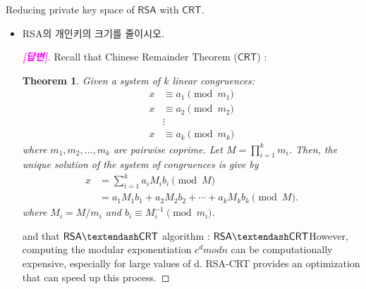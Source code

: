 \documentclass{article}
\newtheorem*{theorem*}{Theorem}
\newcommand{\rsa}{\mathsf{RSA}}
\newcommand{\rsacrt}{\mathsf{RSA}\textendash\mathsf{CRT}}
\newcommand{\inv}[1]{#1^{-1}}
\begin{document}
	
	
	\begin{center}
		\huge Reducing private key space of $\rsa$ with $\mathsf{CRT}$.
	\end{center}
	
	\begin{itemize}
		\item RSA의 개인키의 크기를 줄이시오. \begin{proof}[\normalfont\bf\textcolor{magenta}{[답변]}]
			Recall that Chinese Remainder Theorem ($\mathsf{CRT}$) : 
			\begin{tcolorbox}[title=Chinese Remainder Theorem (CRT)]
				\begin{theorem*}
					Given a system of $k$ linear congruences:
					\begin{align*}
					x&\equiv a_1 \pmod{m_1}\\
					x&\equiv a_2 \pmod{m_2}\\
					&\vdots \\
					x&\equiv a_k \pmod{m_k}
					\end{align*} where $m_1,m_2,\dots, m_k$ are pairwise coprime. Let $M=\prod_{i=1}^km_i$. Then, the unique solution of the system of congruences is give by \begin{align*}
					x&=\sum_{i=1}^ka_iM_ib_i\pmod{M}\\
					&=a_1M_1b_1+a_2M_2b_2+\cdots+a_kM_kb_k\pmod{M}.
					\end{align*} where $M_i=M/m_i$ and $ b_i\equiv\inv{M_i}\pmod{m_i}$.
				\end{theorem*}
			\end{tcolorbox}
			
			and that $\rsacrt$ algorithm :  
			\newpage
			$\rsacrt$However, computing the modular exponentiation $c^d mod n$ can be computationally expensive, especially for large values of d. RSA-CRT provides an optimization that can speed up this process.
			

\end{proof}
\end{itemize}
\end{document}
